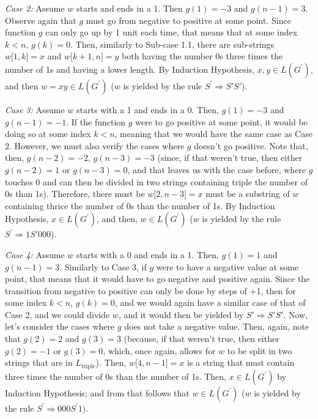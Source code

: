\documentclass[12pt]{article}
\begin{document}
\textit{Case 2:} Assume \(w\) starts and ends in a 1. Then \(g(1) = - 3\) and
\(g(n - 1) = 3\). Observe again that \(g\) must go from negative to
positive at some point. Since function \(g\) can only go up by 1 unit
each time, that means that at some index \(k < n\), \(g(k) = 0\). Then,
similarly to Sub-case 1.1, there are sub-strings
\(w\lbrack 1,k\rbrack = x\) and \(w\lbrack k + 1,n\rbrack = y\) both
having the number 0s three times the number of 1s and having a lower
length. By Induction Hypothesis, \(x,y \in L(G^{'})\), and then
\(w = xy \in L(G^{'})\) (\(w\) is yielded by the rule
\(S^{'} \Rightarrow S'S'\)).

\textit{Case 3:} Assume \(w\) starts with a 1 and ends in a 0. Then,
\(g(1) = - 3\) and \(g(n - 1) = - 1\). If the function \(g\) were to go
positive at some point, it would be doing so at some index \(k < n\),
meaning that we would have the same case as Case 2. However, we must
also verify the cases where \(g\) doesn't go positive. Note that, then,
\(g(n - 2) = - 2\), \(g(n - 3) = - 3\) (since, if that weren't true,
then either \(g(n - 2) = 1\) or \(g(n - 3) = 0\), and that leaves us
with the case before, where \(g\) touches \(0\) and can then be divided
in two strings containing triple the number of 0s than 1s). Therefore,
there must be \(w\lbrack 2,n - 3\rbrack = x\) must be a substring of
\(w\) containing thrice the number of 0s than the number of 1s. By
Induction Hypothesis, \(x \in L(G^{'})\), and then, \(w \in L(G^{'})\)
(\(w\) is yielded by the rule \(S^{'} \Rightarrow 1S'000\)).

\textit{Case 4:} Assume \(w\) starts with a 0 and ends in a 1. Then, \(g(1) = 1\)
and \(g(n - 1) = 3\). Similarly to Case 3, if \(g\) were to have a
negative value at some point, that means that it would have to go
negative and positive again. Since the transition from negative to
positive can only be done by steps of +1, then for some index \(k < n\),
\(g(k) = 0\), and we would again have a similar case of that of Case 2,
and we could divide \(w\), and it would then be yielded by
\(S' \Rightarrow S'S'\). Now, let's consider the cases where \(g\) does
not take a negative value. Then, again, note that \(g(2) = 2\) and
\(g(3) = 3\) (because, if that weren't true, then either \(g(2) = - 1\)
or \(g(3) = 0\), which, once again, allows for \(w\) to be split in two
strings that are in \(L_{\text{triple}}\)). Then,
\(w\lbrack 4,n - 1\rbrack = x\) is a string that must contain three
times the number of 0s than the number of 1s. Then, \(x \in L(G^{'})\)
by Induction Hypothesis; and from that follows that \(w \in L(G^{'})\)
(\(w\) is yielded by the rule \(S^{'} \Rightarrow 000S^{'}1)\).
\end{document}
